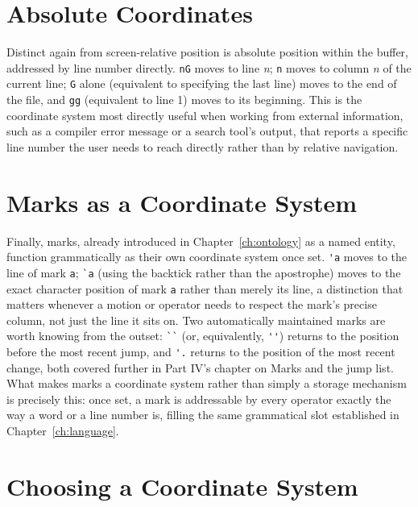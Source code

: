 \section{Absolute Coordinates}

Distinct again from screen-relative position is absolute position within the buffer, addressed by line number directly. \texttt{nG} moves to line \textit{n}; \texttt{n\textbar} moves to column \textit{n} of the current line; \texttt{G} alone (equivalent to specifying the last line) moves to the end of the file, and \texttt{gg} (equivalent to line 1) moves to its beginning. This is the coordinate system most directly useful when working from external information, such as a compiler error message or a search tool's output, that reports a specific line number the user needs to reach directly rather than by relative navigation.

\section{Marks as a Coordinate System}

Finally, marks, already introduced in Chapter~\ref{ch:ontology} as a named entity, function grammatically as their own coordinate system once set. \verb|'a| moves to the line of mark \texttt{a}; \verb|`a| (using the backtick rather than the apostrophe) moves to the exact character position of mark \texttt{a} rather than merely its line, a distinction that matters whenever a motion or operator needs to respect the mark's precise column, not just the line it sits on. Two automatically maintained marks are worth knowing from the outset: \verb|``| (or, equivalently, \verb|''|) returns to the position before the most recent jump, and \verb|'.| returns to the position of the most recent change, both covered further in Part IV's chapter on Marks and the jump list. What makes marks a coordinate system rather than simply a storage mechanism is precisely this: once set, a mark is addressable by every operator exactly the way a word or a line number is, filling the same grammatical slot established in Chapter~\ref{ch:language}.

\section{Choosing a Coordinate System}


